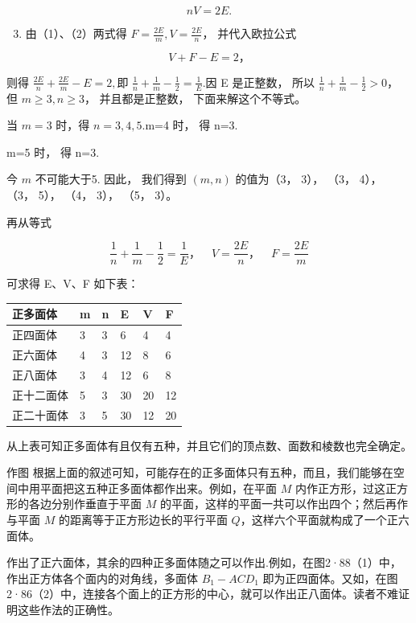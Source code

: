 \[
n V = 2 E. \tag {2}
\]

\begin{enumerate}
\setcounter{enumi}{2}
\item
  由（1）、（2）两式得 \(F = \frac{2E}{m}, V = \frac{2E}{n}\)，
  并代入欧拉公式
\end{enumerate}

\[
V + F - E = 2\text{，}
\]

则得 \(\frac{2E}{n} +\frac{2E}{m} -E = 2,\)即
\(\frac{1}{n} +\frac{1}{m} -\frac{1}{2} = \frac{1}{E}.\)因 E 是正整数，
所以 \(\frac{1}{n} + \frac{1}{m} - \frac{1}{2} > 0\)， 但
\(m \geqslant 3, n \geqslant 3\)， 并且都是正整数， 下面来解这个不等式。

当 \(m = 3\) 时，得 \(n = 3,4,5.\)m=4 时， 得 n=3.

m=5 时， 得 n=3.

今 \(m\) 不可能大于5. 因此， 我们得到 \((m, n)\) 的值为（3， 3）， （3，
4）， （3， 5）， （4， 3）， （5， 3）。

再从等式

\[
\frac {1}{n} + \frac {1}{m} - \frac {1}{2} = \frac {1}{E}\text{，} \quad V = \frac {2 E}{n}\text{，} \quad F = \frac {2 E}{m}
\]

可求得 E、V、F 如下表：

{\def\LTcaptype{none} %
\begin{longtable}[]{@{}llllll@{}}
\toprule\noalign{}
正多面体 & m & n & E & V & F \\
\midrule\noalign{}
\endhead
\bottomrule\noalign{}
\endlastfoot
正四面体 & 3 & 3 & 6 & 4 & 4 \\
正六面体 & 4 & 3 & 12 & 8 & 6 \\
正八面体 & 3 & 4 & 12 & 6 & 8 \\
正十二面体 & 5 & 3 & 30 & 20 & 12 \\
正二十面体 & 3 & 5 & 30 & 12 & 20 \\
\end{longtable}
}

从上表可知正多面体有且仅有五种，并且它们的顶点数、面数和棱数也完全确定。

作图
根据上面的叙述可知，可能存在的正多面体只有五种，而且，我们能够在空间中用平面把这五种正多面体都作出来。例如，在平面
\(M\) 内作正方形，过这正方形的各边分别作垂直于平面 \(M\)
的平面，这样的平面一共可以作出四个；然后再作与平面 \(M\)
的距离等于正方形边长的平行平面 \(Q\)，这样六个平面就构成了一个正六面体。

作出了正六面体，其余的四种正多面体随之可以作出.例如，在图2·88（1）中，作出正方体各个面内的对角线，多面体
\(B_{1} - ACD_{1}\)
即为正四面体。又如，在图2·86（2）中，连接各个面上的正方形的中心，就可以作出正八面体。读者不难证明这些作法的正确性。

